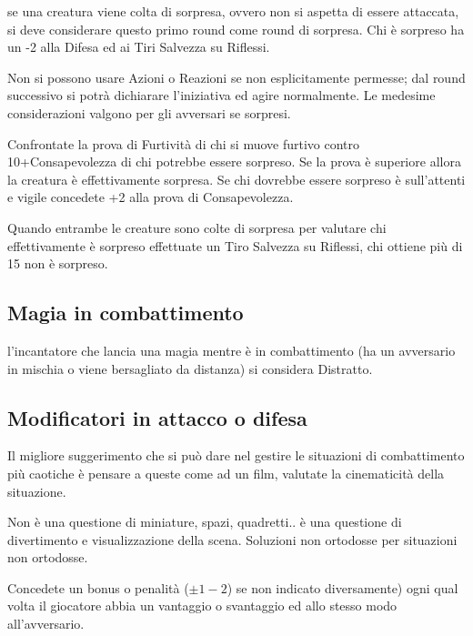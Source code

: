 \begin{multicols}{2}
se una creatura viene colta di sorpresa, ovvero non si aspetta di essere attaccata, si deve considerare questo primo round come round di sorpresa. Chi è sorpreso ha un -2 alla Difesa ed ai Tiri Salvezza su Riflessi.

Non si possono usare Azioni o Reazioni se non esplicitamente permesse; dal round successivo si potrà dichiarare l'iniziativa ed agire normalmente. Le medesime considerazioni valgono per gli avversari se sorpresi.

Confrontate la prova di Furtività di chi si muove furtivo contro 10+Consapevolezza di chi potrebbe essere sorpreso. Se la prova è superiore allora la creatura è effettivamente sorpresa. Se chi dovrebbe essere sorpreso è sull'attenti e vigile concedete +2 alla prova di Consapevolezza.

Quando entrambe le creature sono colte di sorpresa per valutare chi effettivamente è sorpreso effettuate un Tiro Salvezza su Riflessi, chi ottiene più di 15 non è sorpreso.

\subsection{Magia in combattimento}\label{magiaincombattimento}

l'incantatore che lancia una magia mentre è in combattimento (ha un avversario in mischia o viene bersagliato da distanza) si considera Distratto.

%

\subsection{Modificatori in attacco o difesa} \label{modificatoriattaccodifesaparticolari}

Il migliore suggerimento che si può dare nel gestire le situazioni di combattimento più caotiche è pensare a queste come ad un film, valutate la cinematicità della situazione.

Non è una questione di miniature, spazi, quadretti.. è una questione di divertimento e visualizzazione della scena. Soluzioni non ortodosse per situazioni non ortodosse.

Concedete un bonus o penalità ($\pm 1-2$) se non indicato diversamente) ogni qual volta il giocatore abbia un vantaggio o svantaggio ed allo stesso modo all'avversario.

\medskip

\end{multicols}

